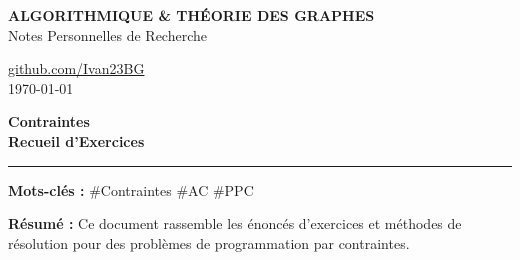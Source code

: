 \begin{titlepage}
    \pagecolor{bgcolor}
    \color{textcolor}
    
    \begin{minipage}[t]{0.65\textwidth}
        \raggedright\strut
        {\small\bfseries\color{exocolor} ALGORITHMIQUE \& THÉORIE DES GRAPHES}\\[2pt]
        {\small\color{fallbackcolor} Notes Personnelles de Recherche}
    \end{minipage}%
    \hfill
    \begin{minipage}[t]{0.3\textwidth}
        \raggedleft\strut
        {\small 
            \href{https://github.com/Ivan23BG/cours-graphes}{\color{fallbackcolor}github.com/Ivan23BG}\\[2pt]
            \color{fallbackcolor}\today
        }
    \end{minipage}

    \vfill

    \begin{tcolorbox}[
        enhanced,
        colback=boxbg,
        colframe=exocolor,
        boxrule=0pt,
        leftrule=4pt,
        arc=0mm,
        top=16pt, bottom=16pt, left=18pt, right=18pt
    ]
        {\Huge\bfseries\color{textcolor} Contraintes}\\[6pt]
        {\large\color{exocolor}\bfseries Recueil d'Exercices}
        
        \vspace{10pt}
        \color{textcolor}\rule{\textwidth}{0.4pt}
        \vspace{8pt}

        {\small
        \textbf{Mots-clés :} \#Contraintes \quad \#AC \quad \#PPC
        }
    \end{tcolorbox}

    \vfill

    

    \vfill

    \begin{tcolorbox}[
        blanker,
        left=12pt,
        borderline west={1.5pt}{0pt}{fallbackcolor}
    ]
        {\small\color{fallbackcolor}
        \textbf{Résumé :} Ce document rassemble les énoncés d'exercices et méthodes de résolution pour des problèmes de programmation par contraintes.
        }
    \end{tcolorbox}


\end{titlepage}
